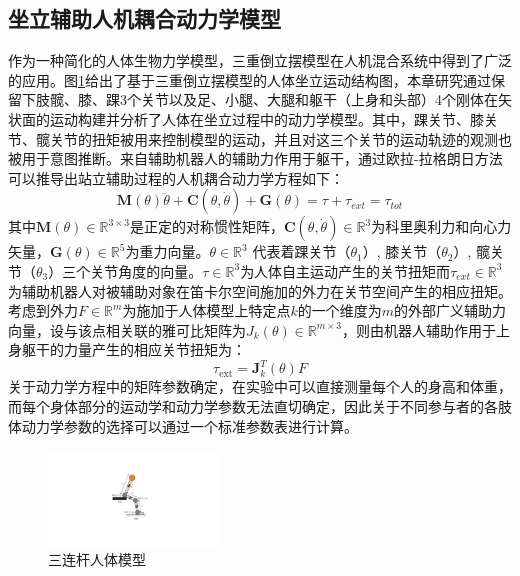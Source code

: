 \subsection{坐立辅助人机耦合动力学模型}  
作为一种简化的人体生物力学模型，三重倒立摆模型在人机混合系统中得到了广泛的应用。图\ref{fig:4-1}给出了基于三重倒立摆模型的人体坐立运动结构图，本章研究通过保留下肢髋、膝、踝3个关节以及足、小腿、大腿和躯干（上身和头部）4个刚体在矢状面的运动构建并分析了人体在坐立过程中的动力学模型。其中，踝关节、膝关节、髋关节的扭矩被用来控制模型的运动，并且对这三个关节的运动轨迹的观测也被用于意图推断。来自辅助机器人的辅助力作用于躯干，通过欧拉-拉格朗日方法可以推导出站立辅助过程的人机耦合动力学方程如下：
\begin{equation}
    \mathbf{M}(\theta) \ddot{\theta}+\mathbf{C}(\theta, \dot{\theta})+\mathbf{G}(\theta)=\tau+\tau_{ext}=\tau_{tot}
    \label{eq:4-1}
\end{equation}
其中$\mathbf{M}(\theta)\in \mathbb{R}^{3\times 3}$是正定的对称惯性矩阵，$\mathbf{C}(\theta, \dot{\theta})\in \mathbb{R}^3$为科里奥利力和向心力矢量，$\mathbf{G}(\theta)\in \mathbb{R}^5$为重力向量。$\theta \in \mathbb{R}^3$ 代表着踝关节（$\theta_1$）, 膝关节（$\theta_2$）, 髋关节（$\theta_3$）三个关节角度的向量。$\tau \in \mathbb{R}^3$为人体自主运动产生的关节扭矩而$\tau_{ext} \in \mathbb{R}^3$为辅助机器人对被辅助对象在笛卡尔空间施加的外力在关节空间产生的相应扭矩。考虑到外力$F\in \mathbb{R}^m$为施加于人体模型上特定点$k$的一个维度为$m$的外部广义辅助力向量，设与该点相关联的雅可比矩阵为$J_k(\theta)\in \mathbb{R}^{m\times 3}$，则由机器人辅助作用于上身躯干的力量产生的相应关节扭矩为：
\begin{equation}
    \tau_{\text {ext}}=\mathbf{J}_k^T(\theta) F
    \label{eq:4-2}
\end{equation}
关于动力学方程中的矩阵参数确定，在实验中可以直接测量每个人的身高和体重，而每个身体部分的运动学和动力学参数无法直切确定，因此关于不同参与者的各肢体动力学参数的选择可以通过一个标准参数表进行计算\cite{tozerenHumanBodyDynamics2000}。

\begin{figure}[htb]
    \centering\includegraphics[width=0.4\textwidth]{figures/4-Fig-1.pdf}
    \caption{三连杆人体模型}
    \label{fig:4-1}
\end{figure}
